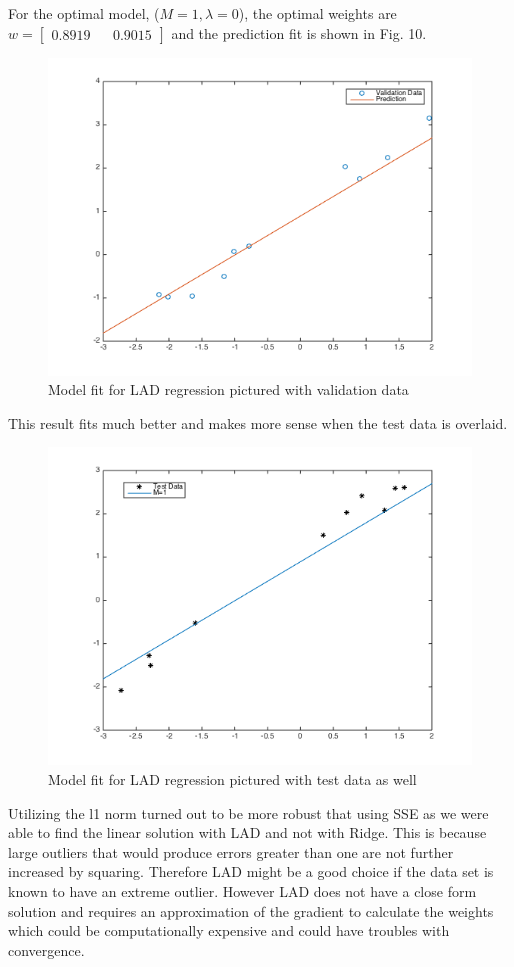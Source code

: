 \documentclass[10pt,twocolumn]{article}
\begin{document}
For the optimal model, ($M=1, \lambda = 0$), the optimal weights are $w= \begin{bmatrix} 0.8919  &&   0.9015 \end{bmatrix}$ and the prediction fit is shown in Fig. 10. 
\begin{figure}[H]
\center
\includegraphics[scale =.4]{4_1.png}
\caption{Model fit for LAD regression pictured with validation data}
\end{figure}

This result fits much better and makes more sense when the test data is overlaid. 
\begin{figure}[H]
\center
\includegraphics[scale =.4]{4_1test.png}
\caption{Model fit for LAD regression pictured with test data as well}
\end{figure}

Utilizing the l1 norm turned out to be more robust that using SSE as we were able to find the linear solution with LAD and not with Ridge. This is because large outliers that would produce errors greater than one are not further increased by squaring. Therefore LAD might be a good choice if the data set is known to have an extreme outlier. However LAD does not have a close form solution and requires an approximation of the gradient to calculate the weights which could be computationally expensive and could have troubles with convergence. 
 
 
\end{document}
